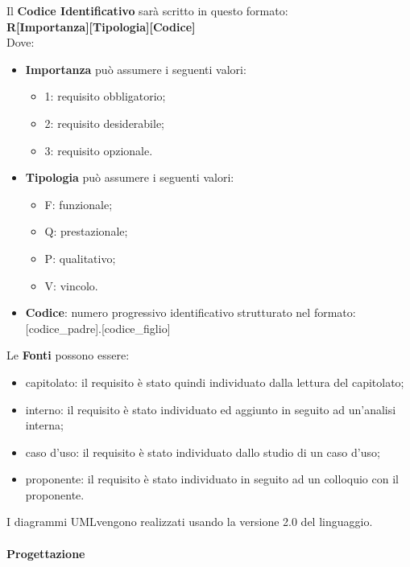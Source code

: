 Il \textbf{Codice Identificativo} sarà scritto in questo formato: \\
\textbf{R[Importanza][Tipologia][Codice]} \\
Dove:
\begin{itemize}
	\item \textbf{Importanza} può assumere i seguenti valori:
	\begin{itemize}
		\item 1: requisito obbligatorio;
		\item 2: requisito desiderabile;
		\item 3: requisito opzionale.
	\end{itemize}
	\item \textbf{Tipologia} può assumere i seguenti valori:
	\begin{itemize}
		\item F: funzionale;
		\item Q: prestazionale;
		\item P: qualitativo;
		\item V: vincolo.
	\end{itemize}
	\item\textbf{Codice}: numero progressivo identificativo strutturato nel formato: [codice\_padre].[codice\_figlio]
\end{itemize}
Le \textbf{Fonti} possono essere:
\begin{itemize}
	\item capitolato\glo: il requisito è stato quindi individuato dalla lettura del capitolato\glo;
	\item interno: il requisito è stato individuato ed aggiunto in seguito ad un'analisi interna;
	\item caso d'uso\glo: il requisito è stato individuato dallo studio di un caso d'uso\glo;
	\item proponente: il requisito è stato individuato in seguito ad un colloquio con il proponente.
\end{itemize}
I diagrammi UML\glosp vengono realizzati usando la versione 2.0 del linguaggio.\pagebreak
\paragraph{Progettazione}
